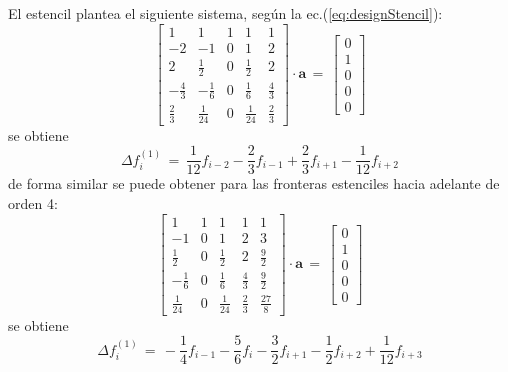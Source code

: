 \documentclass[9pt,technote,twoside,letterpaper,onecolumn]{IEEEtran}
\begin{document}
\begin{multicols}{2}
El estencil plantea el siguiente sistema, según la ec.(\ref{eq:designStencil}):
{\small
\begin{equation}
  \left[\begin{matrix}
      1 & 1 & 1 & 1 & 1\\
      -2 & -1 & 0 & 1 & 2\\
      2 & \frac{1}{2} & 0 & \frac{1}{2} & 2\\
      - \frac{4}{3} & - \frac{1}{6} & 0 & \frac{1}{6} & \frac{4}{3}\\
      \frac{2}{3} & \frac{1}{24} & 0 & \frac{1}{24} & \frac{2}{3}
    \end{matrix}\right]
  \cdot \mathbf{a}\,=\,
  \left[\begin{matrix}
      0\\
      1\\
      0\\
      0\\
      0
    \end{matrix}\right]
  \label{eq:cds4}
\end{equation}
}
se obtiene 
\begin{equation}
  \Delta f^{(1)}_i\,=\,\frac{1}{12}f_{i-2}-\frac{2}{3}f_{i-1}+\frac{2}{3}f_{i+1}-\frac{1}{12}f_{i+2}
  \label{eq:cds4stencil}
\end{equation}
de forma similar se puede obtener para las fronteras estenciles hacia adelante de orden 4:
{\small
\begin{equation}
  \left[\begin{matrix}
      1 & 1 & 1 & 1 & 1\\
      -1 & 0 & 1 & 2 & 3\\
      \frac{1}{2} & 0 & \frac{1}{2} & 2 & \frac{9}{2}\\
      - \frac{1}{6} & 0 & \frac{1}{6} & \frac{4}{3} & \frac{9}{2}\\
      \frac{1}{24} & 0 & \frac{1}{24} & \frac{2}{3} & \frac{27}{8}
    \end{matrix}\right]  
  \cdot \mathbf{a}\,=\,
  \left[\begin{matrix}
      0\\
      1\\
      0\\
      0\\
      0
    \end{matrix}\right]
  \label{eq:cds4-bound}
\end{equation}}
se obtiene 
\begin{equation} %
  \Delta f^{(1)}_i\,=\,-\frac{1}{4}f_{i-1}-\frac{5}{6}f_{i}-\frac{3}{2}f_{i+1}-\frac{1}{2}f_{i+2}+\frac{1}{12}f_{i+3}
  \label{eq:cds4stencilbound}
\end{equation}


\end{multicols}
\end{document}
